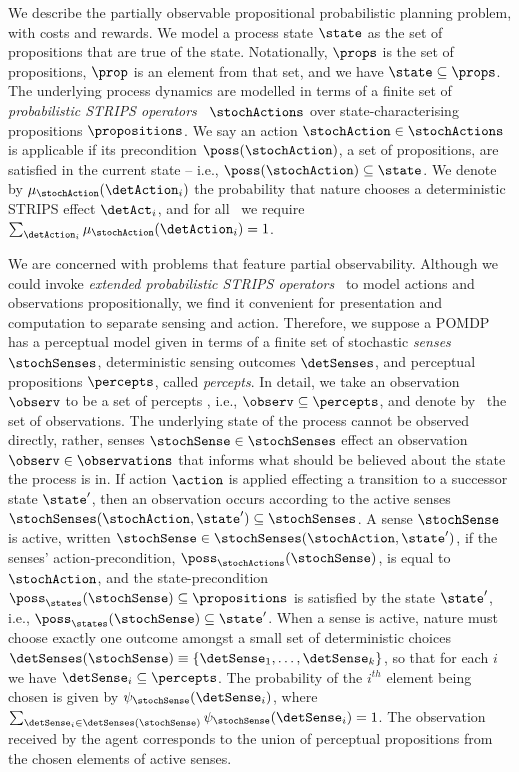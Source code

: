 
We describe the partially observable propositional probabilistic
planning problem, with costs and rewards. We model a process state
$\state$ as the set of propositions that are true of the
state. Notationally, $\props$ is the set of propositions, $\prop$ is
an element from that set, and we have $\state \subseteq
\props$. The underlying process
dynamics are modelled in terms of a finite set of {\em probabilistic
STRIPS operators}~\cite{boutilier:abstraction} $\stochActions$ over
state-characterising propositions $\propositions$.
We say an action $\stochAction \in \stochActions$ is
applicable if its precondition $\poss(\stochAction)$, a set of
propositions, are satisfied in the current state -- i.e., $\poss(\stochAction) \subseteq
\state$. We denote by $\mu_{\stochAction}(\detAction_i)$ the probability that
nature chooses a deterministic STRIPS effect $\detAct_i$, and for
all \stochAction\ we require
$\sum_{\detAction_i}
\mu_{\stochAction}(\detAction_i) = 1$.

We are concerned with problems that feature partial
observability. Although we could invoke {\em extended probabilistic
STRIPS operators}~\cite{rintanen:01} to model actions and observations
propositionally, we find it convenient for presentation and
computation to separate sensing and action. Therefore, we suppose a
POMDP has a perceptual model given in terms of a finite set of
stochastic {\em senses} $\stochSenses$, deterministic sensing outcomes
$\detSenses$, and perceptual propositions $\percepts$, called {\em
percepts}. In detail, we take an observation $\observ$ to be a set of
percepts , i.e., $\observ \subseteq \percepts$, and denote
by \observations\ the set of  observations. The underlying
state of the process cannot be observed directly, rather, senses
$\stochSense \in \stochSenses$ effect an observation $\observ \in
\observations$ that informs what should be believed about the state the
process is in. If action $\action$ is applied effecting a
transition to a successor state $\state'$, then an observation occurs
according to the active senses $\stochSenses(\stochAction, \state')
\subseteq \stochSenses$. A sense $\stochSense$ is active, written
$\stochSense \in \stochSenses(\stochAction, \state')$, if the senses'
action-precondition, $\poss_\stochActions(\stochSense)$, is equal to
$\stochAction$, and the state-precondition $\poss_\states(\stochSense)
\subseteq \propositions$ is satisfied by the state $\state'$, i.e., \mbox{$\poss_\states(\stochSense)\subseteq\state'$}.
When a sense is active, nature must choose exactly one outcome amongst
a small set of deterministic choices $\detSenses(\stochSense)
\equiv \{\detSense_1, \ldots, \detSense_k \}$, so that for each
$i$ we have $\detSense_i \subseteq \percepts$. The probability of
the $i^{th}$ element being chosen is given by
$\psi_{\stochSense}(\detSense_i)$, where $\sum_{\detSense_i \in
\detSenses(\stochSense)} \psi_{\stochSense}(\detSense_i) =
1$. The observation received by the agent corresponds to the union of
perceptual propositions from the chosen elements of active
senses.

